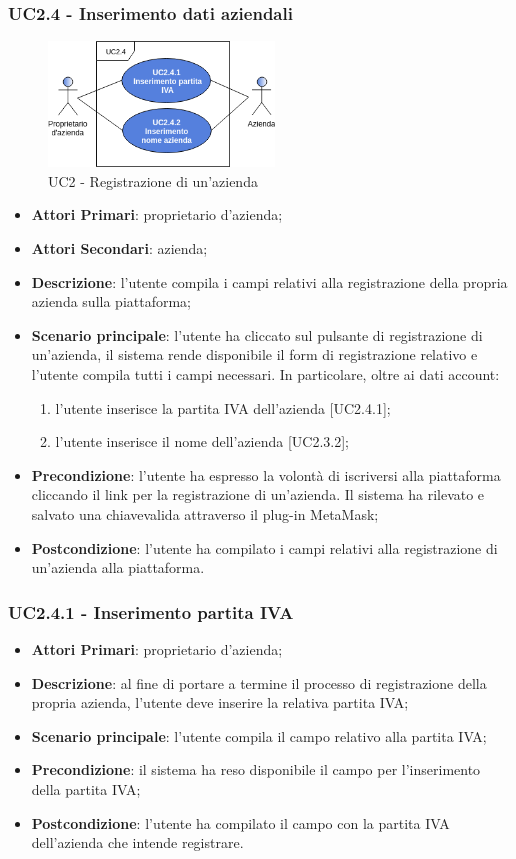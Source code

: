 \subsubsection{UC2.4 - Inserimento dati aziendali}
\begin{figure}[h]
	\includegraphics[width=6cm]{res/images/UC2-4RegistrazioneAzienda.png}
	\centering
	\caption{UC2 - Registrazione di un'azienda}
\end{figure}
\begin{itemize}
	\item \textbf{Attori Primari}: proprietario d'azienda;
	\item \textbf{Attori Secondari}: azienda;
	\item \textbf{Descrizione}: l'utente compila i campi relativi alla registrazione della propria azienda sulla piattaforma;
	\item \textbf{Scenario principale}: l'utente ha cliccato sul pulsante di registrazione di un'azienda, il sistema rende disponibile il form di registrazione relativo e l'utente compila tutti i campi necessari. In particolare, oltre ai dati account:
	\begin{enumerate}[label=\alph*.]
		\item l'utente inserisce la partita IVA dell'azienda [UC2.4.1];
		\item l'utente inserisce il nome dell'azienda [UC2.3.2];
	\end{enumerate}
	\item \textbf{Precondizione}: l'utente ha espresso la volontà di iscriversi alla piattaforma cliccando il link per la registrazione di un'azienda. Il sistema ha rilevato e salvato una chiave\glosp valida attraverso il plug-in MetaMask\glo;
	\item \textbf{Postcondizione}: l'utente ha compilato i campi relativi alla registrazione di un'azienda alla piattaforma.
\end{itemize}
\subsubsection{UC2.4.1 - Inserimento partita IVA}
\begin{itemize}
	\item \textbf{Attori Primari}: proprietario d'azienda;
	\item \textbf{Descrizione}: al fine di portare a termine il processo di registrazione della propria azienda, l'utente deve inserire la relativa partita IVA;
	\item \textbf{Scenario principale}: l'utente compila il campo relativo alla partita IVA;
	\item \textbf{Precondizione}: il sistema ha reso disponibile il campo per l'inserimento della partita IVA;
	\item \textbf{Postcondizione}: l'utente ha compilato il campo con la partita IVA dell'azienda che intende registrare.
\end{itemize}
